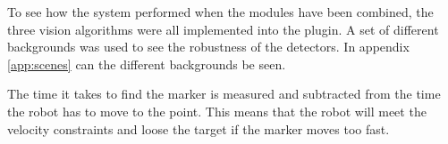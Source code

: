 To see how the system performed when the modules have been combined, the three vision algorithms were all implemented into the plugin.
A set of different backgrounds was used to see the robustness of the detectors.
In appendix \ref{app:scenes} can the different backgrounds be seen.

The time it takes to find the marker is measured and subtracted from the time the robot has to move to the point.
This means that the robot will meet the velocity constraints and loose the target if the marker moves too fast.